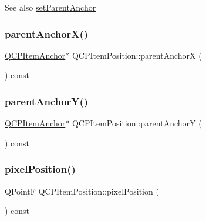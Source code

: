 \begin{DoxySeeAlso}{See also}
\hyperlink{class_q_c_p_item_position_ac094d67a95d2dceafa0d50b9db3a7e51}{set\+Parent\+Anchor} 
\end{DoxySeeAlso}
\mbox{\label{class_q_c_p_item_position_a605cb8b2cf6044d3d03cb1a894faf98a}} 
\subsubsection{\texorpdfstring{parent\+Anchor\+X()}{parentAnchorX()}}
{\footnotesize\ttfamily \hyperlink{class_q_c_p_item_anchor}{Q\+C\+P\+Item\+Anchor}$\ast$ Q\+C\+P\+Item\+Position\+::parent\+AnchorX (\begin{DoxyParamCaption}{ }\end{DoxyParamCaption}) const\hspace{0.3cm}{\ttfamily [inline]}}

\mbox{\label{class_q_c_p_item_position_aa40afec791a4339b09572922ca425ec2}} 
\subsubsection{\texorpdfstring{parent\+Anchor\+Y()}{parentAnchorY()}}
{\footnotesize\ttfamily \hyperlink{class_q_c_p_item_anchor}{Q\+C\+P\+Item\+Anchor}$\ast$ Q\+C\+P\+Item\+Position\+::parent\+AnchorY (\begin{DoxyParamCaption}{ }\end{DoxyParamCaption}) const\hspace{0.3cm}{\ttfamily [inline]}}

\mbox{\label{class_q_c_p_item_position_a8be9a4787635433edecc75164beb748d}} 
\subsubsection{\texorpdfstring{pixel\+Position()}{pixelPosition()}}
{\footnotesize\ttfamily Q\+PointF Q\+C\+P\+Item\+Position\+::pixel\+Position (\begin{DoxyParamCaption}{ }\end{DoxyParamCaption}) const\hspace{0.3cm}{\ttfamily [virtual]}}

